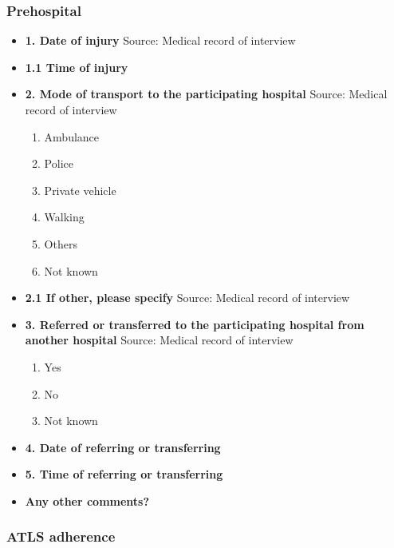 \documentclass[
]{scrartcl}
\providecommand{\tightlist}{%
  \setlength{\itemsep}{0pt}\setlength{\parskip}{0pt}}\usepackage{longtable,booktabs,array}
\begin{document}
\hypertarget{prehospital}{%
\subsubsection{Prehospital}\label{prehospital}}

\begin{itemize}
\item
  \textbf{1. Date of injury} Source: Medical record of interview
\item
  \textbf{1.1 Time of injury}
\item
  \textbf{2. Mode of transport to the participating hospital} Source:
  Medical record of interview

  \begin{enumerate}
  \def\labelenumi{\arabic{enumi}.}
  \tightlist
  \item
    Ambulance
  \item
    Police
  \item
    Private vehicle
  \item
    Walking
  \item
    Others
  \item
    Not known
  \end{enumerate}
\item
  \textbf{2.1 If other, please specify} Source: Medical record of
  interview
\item
  \textbf{3. Referred or transferred to the participating hospital from
  another hospital} Source: Medical record of interview

  \begin{enumerate}
  \def\labelenumi{\arabic{enumi}.}
  \tightlist
  \item
    Yes
  \item
    No
  \item
    Not known
  \end{enumerate}
\item
  \textbf{4. Date of referring or transferring}
\item
  \textbf{5. Time of referring or transferring}
\item
  \textbf{Any other comments?}
\end{itemize}

\hypertarget{atls-adherence}{%
\subsubsection{ATLS adherence}\label{atls-adherence}}
\end{document}
